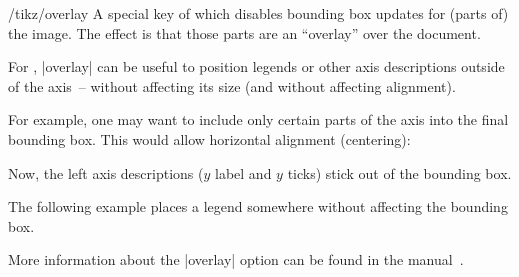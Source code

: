 \begin{key}{/tikz/overlay}
    A special key of \PGF{} which disables bounding box updates for (parts of)
    the image. The effect is that those parts are an ``overlay'' over the
    document.

    For \PGFPlots{}, |overlay| can be useful to position legends or other axis
    descriptions outside of the axis~-- without affecting its size (and without
    affecting alignment).

    For example, one may want to include only certain parts of the axis into
    the final bounding box. This would allow horizontal alignment (centering):
\begin{codeexample}[]
\end{codeexample}
    \noindent Now, the left axis descriptions ($y$ label and $y$ ticks) stick
    out of the bounding box.

    The following example places a legend somewhere without affecting the
    bounding box.
\begin{codeexample}[]
\end{codeexample}

    More information about the |overlay| option can be found in the \PGF{}
    manual~\cite{tikz}.
\end{key}

